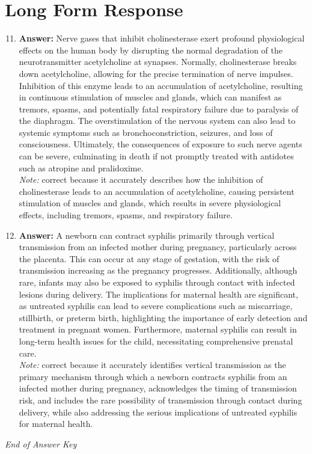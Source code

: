 \documentclass[12pt]{article}
\begin{document}
\section*{Long Form Response}
\begin{enumerate}[label=\arabic*.]
\setcounter{enumi}{10}
\item \textbf{Answer:} Nerve gases that inhibit cholinesterase exert profound physiological effects on the human body by disrupting the normal degradation of the neurotransmitter acetylcholine at synapses. Normally, cholinesterase breaks down acetylcholine, allowing for the precise termination of nerve impulses. Inhibition of this enzyme leads to an accumulation of acetylcholine, resulting in continuous stimulation of muscles and glands, which can manifest as tremors, spasms, and potentially fatal respiratory failure due to paralysis of the diaphragm. The overstimulation of the nervous system can also lead to systemic symptoms such as bronchoconstriction, seizures, and loss of consciousness. Ultimately, the consequences of exposure to such nerve agents can be severe, culminating in death if not promptly treated with antidotes such as atropine and pralidoxime.
\\ \textit{Note:} correct because it accurately describes how the inhibition of cholinesterase leads to an accumulation of acetylcholine, causing persistent stimulation of muscles and glands, which results in severe physiological effects, including tremors, spasms, and respiratory failure.
\item \textbf{Answer:} A newborn can contract syphilis primarily through vertical transmission from an infected mother during pregnancy, particularly across the placenta. This can occur at any stage of gestation, with the risk of transmission increasing as the pregnancy progresses. Additionally, although rare, infants may also be exposed to syphilis through contact with infected lesions during delivery. The implications for maternal health are significant, as untreated syphilis can lead to severe complications such as miscarriage, stillbirth, or preterm birth, highlighting the importance of early detection and treatment in pregnant women. Furthermore, maternal syphilis can result in long-term health issues for the child, necessitating comprehensive prenatal care.
\\ \textit{Note:} correct because it accurately identifies vertical transmission as the primary mechanism through which a newborn contracts syphilis from an infected mother during pregnancy, acknowledges the timing of transmission risk, and includes the rare possibility of transmission through contact during delivery, while also addressing the serious implications of untreated syphilis for maternal health.
\end{enumerate}

\vfill
\noindent\textit{End of Answer Key}
\end{document}
